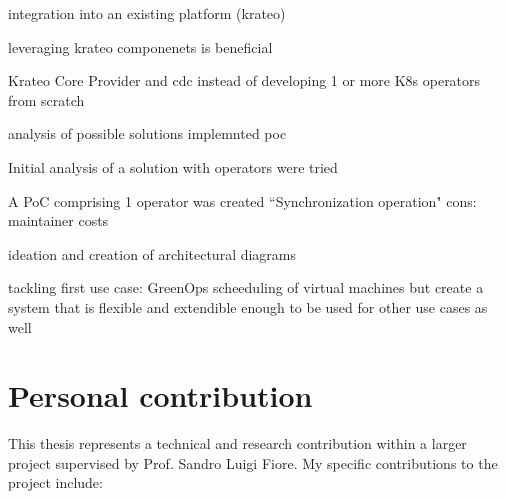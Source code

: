 integration into an existing platform (krateo)

leveraging krateo componenets is beneficial 

Krateo Core Provider and cdc instead of developing 1 or more K8s operators from scratch


analysis of possible solutions
implemnted poc 

Initial analysis of a solution with operators were tried

A PoC comprising 1 operator was created 
``Synchronization operation"
cons: maintainer costs

ideation and creation of architectural diagrams

tackling first use case: GreenOps scheeduling of virtual machines
but create a system that is flexible and extendible enough to be used for other use cases as well

\section{Personal contribution}

This thesis represents a technical and research contribution within a larger project supervised by Prof. Sandro Luigi Fiore. 
My specific contributions to the project include:


\newpage
